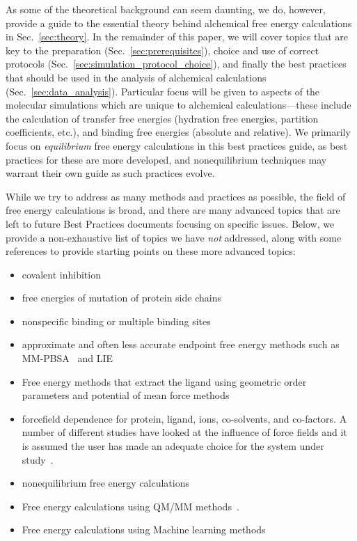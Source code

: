 \documentclass[9pt,bestpractices]{livecoms}
\begin{document}
As some of the theoretical background can seem daunting, we do, however, provide a guide to the essential theory behind alchemical free energy calculations in Sec.~\ref{sec:theory}.
In the remainder of this paper, we will cover topics that are key to the preparation (Sec.~\ref{sec:prerequisites}), choice and use of correct protocols (Sec.~\ref{sec:simulation_protocol_choice}), and finally the best practices that should be used in the analysis of alchemical calculations (Sec.~\ref{sec:data_analysis}). 
Particular focus will be given to aspects of the molecular simulations which are unique to alchemical calculations---these include the calculation of transfer free energies (hydration free energies, partition coefficients, etc.), and binding free energies (absolute and relative). We primarily focus on \emph{equilibrium} free energy calculations in this best practices guide, as best practices for these are more developed, and nonequilibrium techniques may warrant their own guide as such practices evolve. 


While we try to address as many methods and practices as possible, the field of free energy calculations is broad, and there are many advanced topics that are left to future Best Practices documents focusing on specific issues. 
Below, we provide a non-exhaustive list of topics we have \emph{not} addressed, along with some references to provide starting points on these more advanced topics:
\begin{itemize}
\item covalent inhibition~\cite{lameira2019predicting}
\item free energies of mutation of protein side chains~\cite{gapsys2016accurate, aldeghi2018accurate}
\item nonspecific binding or multiple binding sites~\cite{gill2018binding}
\item approximate and often less accurate endpoint free energy methods such as MM-PBSA~\cite{genheden2015mm} and LIE~\cite{gutierrez-de-teran2012linear}
\item Free energy methods that extract the ligand using geometric order parameters and potential of mean force methods~\cite{heinzelmann2017attachpullrelease}
\item forcefield dependence for protein, ligand, ions, co-solvents, and co-factors. A number of different studies have looked at the influence of force fields and it is assumed the user has made an adequate choice for the system under study~\cite{loeffler2018reproducibility, vassetti2019assessment, lopes2015current}. 
\item nonequilibrium free energy calculations~\cite{gapsys2020large}
\item Free energy calculations using QM/MM methods~\cite{beierlein2011simple,dybeck2016comparison,cave-ayland2015direct}.
\item Free energy calculations using Machine learning methods~\cite{rufa2020chemical, scheen2020hybrid, cole2020machine}
\end{itemize}
\end{document}
